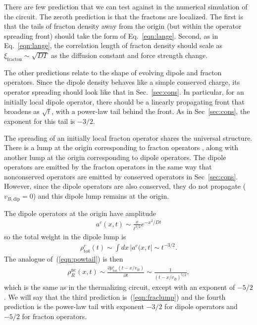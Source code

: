 \documentclass[a4paper,12pt]{article}
\newcommand{\pd}[2]{\frac{\partial #1}{\partial #2}}
\renewcommand{\th}[1]{\frac{1}{#1}}
\newcommand{\abs}[1]{\left| #1 \right|}
\newcommand{\nc}{\text{nc}}
\newcommand{\tot}{\text{tot}}
\newcommand{\note}[1]{{\color{red}{#1}}}
\begin{document}
There are few prediction that we can test against in the numerical simulation of the circuit. The zeroth prediction is that the fractons are localized. The first is that the tails of fracton density away from the origin (but within the operator spreading front) should take the form of Eq.~\ref{eqn:lange}. Second, as in Eq.~\ref{eqn:lange}, the correlation length of fracton density should scale as $\xi_\text{fracton}\sim \sqrt{DT}$ as the diffusion constant and force strength change. 

The other predictions relate to the shape of evolving dipole and fracton operators. Since the dipole density behaves like a simple conserved charge, its operator spreading should look like that in Sec.~\ref{sec:cons}. In particular, for an initially local dipole operator, there should be a linearly propagating front that broadens as $\sqrt{t}$, with a power-law tail behind the front. As in Sec~\ref{sec:cons}, the exponent for this tail is $-3/2$.

The spreading of an initially local fracton operator shares the universal structure. There is a lump at the origin corresponding to fracton operators \note{(does this decrease in time?)}, along with another lump at the origin corresponding to dipole operators. The dipole operators are emitted by the fracton operators in the same way that nonconserved operators are emitted by conserved operators in Sec~\ref{sec:cons}. However, since the dipole operators are also conserved, they do not propagate ($v_{B, \text{dip}}=0$) and this dipole lump remains at the origin.

The dipole operators at the origin have amplitude~\cite{PaiFracton}
\begin{align}
a^c(x,t) \sim \frac{x}{t^{3/2}}e^{-x^2/Dt}
\end{align}
so the total weight in the dipole lump is
\begin{align}
\rho^c_\tot(t) \sim \int dx\,\abs{a^c(x,t} \sim t^{-3/2}. \label{eqn:fraclump}
\end{align}
The analogue of~(\ref{eqn:powtail}) is then
\begin{align}
\rho_R^\nc(x,t)\sim\pd{\rho_\tot^c(t-x/v_B)}{t} \sim\th{(t-x/v_B)^{5/2}}, 
\end{align}
which is the same as in the thermalizing circuit, except with an exponent of $-5/2$. We will say that the third prediction is~(\ref{eqn:fraclump}) and the fourth prediction is the power-law tail with exponent $-3/2$ for dipole operators and $-5/2$ for fracton operators.
\end{document}
